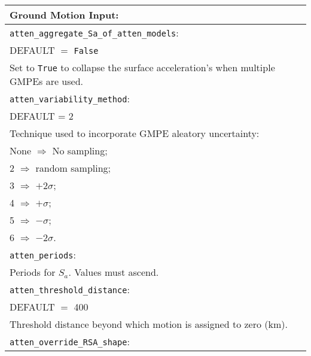 \vspace{2em}
\begin{tabular}{|p{\textwidth}|}
\hline
\vspace{0.3em} \noindent \Large \textbf{Ground Motion Input:} \normalsize \\
\hline \vspace{0.1em}
\texttt{atten\_aggregate\_Sa\_of\_atten\_models}: \\
DEFAULT $=$ \texttt{False} \\
Set to \texttt{True} to collapse the surface acceleration's when
multiple GMPEs are used.\\
\hline \vspace{0.1em} \texttt{atten\_variability\_method}: \\
DEFAULT  = 2 \\
 Technique used to
incorporate GMPE aleatory uncertainty: \\
 \hspace{0.5em} None $\Rightarrow$ No sampling; \\
 \hspace{0.5em} 2 $\Rightarrow$ random sampling; \\
 \hspace{0.5em} 3 $\Rightarrow$ $+2\sigma$; \\
 \hspace{0.5em} 4 $\Rightarrow$ $+\sigma$; \\
 \hspace{0.5em} 5 $\Rightarrow$ $-\sigma$; \\
 \hspace{0.5em} 6 $\Rightarrow$ $-2\sigma$.\\
\hline \vspace{0.1em} \texttt{atten\_periods}: \\
Periods for $S_a$. Values must ascend. \\
\hline
\vspace{0.1em} \texttt{atten\_threshold\_distance}: \\
DEFAULT $=$ 400 \\
Threshold distance beyond which motion is assigned to zero (km). \\
\hline \vspace{0.1em} \texttt{atten\_override\_RSA\_shape}: \\

\end{tabular}
